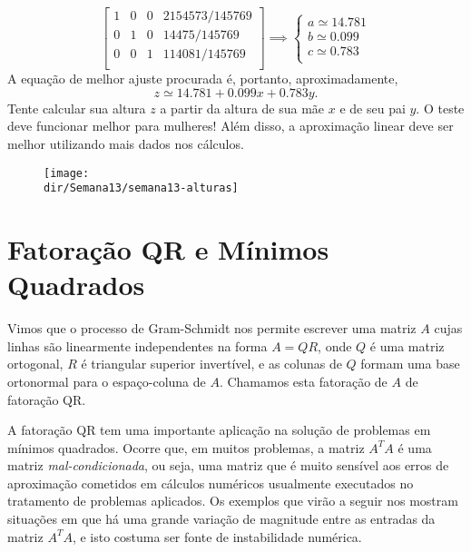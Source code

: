 \documentclass[../livro.tex]{subfiles}  %
\providecommand{\dir}{..}
\begin{document}
\begin{example}
\[  \begin{bmatrix}
    1 & 0 & 0  & 2154573/145769 \\
    0 & 1 & 0  & 14475/145769   \\
    0 & 0 & 1  & 114081/145769  \\
  \end{bmatrix} \implies
  \left\{
    \begin{array}{ll}
      a \simeq 14.781  \\
      b \simeq  0.099  \\
      c \simeq  0.783  \\
    \end{array}
  \right.
  \] A equação de melhor ajuste procurada é, portanto, aproximadamente,
  \[
  z \simeq 14.781 + 0.099 x + 0.783 y.
  \] Tente calcular sua altura $z$ a partir da altura de sua mãe $x$ e de seu pai $y$. O teste deve funcionar melhor para mulheres! Além disso, a aproximação linear deve ser melhor utilizando mais dados nos cálculos.
  \begin{figure}[h!]
    \begin{center}
      \texttt{[image: \\dir/Semana13/semana13-alturas]}
    \end{center}
  \end{figure}
\end{example}

\section{Fatoração QR e Mínimos Quadrados}

Vimos que o processo de Gram-Schmidt nos permite escrever uma matriz $A$ cujas linhas são linearmente independentes na forma $A=QR$, onde $Q$ é uma matriz ortogonal, $R$ é triangular superior invertível, e as colunas de $Q$ formam uma base ortonormal para o espaço-coluna de $A$. Chamamos esta fatoração de $A$ de fatoração QR. 

A fatoração QR tem uma importante aplicação na solução de problemas em mínimos quadrados. Ocorre que, em muitos problemas, a matriz $A^T A$ é uma matriz {\it mal-condicionada}, ou seja, uma matriz que é muito sensível aos erros de aproximação cometidos em cálculos numéricos usualmente executados no tratamento de problemas aplicados. 
Os exemplos que virão a seguir nos mostram situações em que há uma grande variação de magnitude entre as entradas da matriz $A^T A$, e isto costuma ser fonte de instabilidade numérica.
\end{document}
